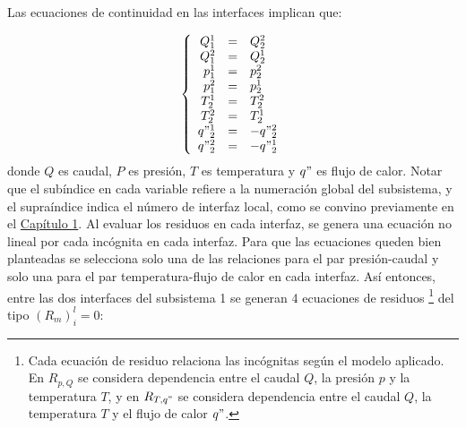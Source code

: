 Las ecuaciones de continuidad en las interfaces implican que:

\begin{equation}
\left\{ \begin{array}{rcl}
Q_1^1&=& Q_2^2 \\
Q_1^2&=& Q_2^1 \\
p_1^1&=& p_2^2 \\
p_1^2&=& p_2^1 \\
T_2^1&=& T_2^2 \\
T_2^2&=& T_2^1 \\
q"_2^1&=& - q"_2^2 \\
q"_2^2&=& - q"_2^1
\end{array}
\right.
\end{equation}
donde $Q$ es caudal, $P$ es presión, $T$ es temperatura y $q"$ es flujo de calor. 
Notar que el subíndice en cada variable refiere a la numeración global del subsistema, y el supraíndice indica el número de interfaz local,
como se convino previamente en el \hyperlink{chapter.1}{Capítulo 1}.
Al evaluar los residuos en cada interfaz, se genera una ecuación no lineal por cada incógnita en cada interfaz.
Para que las ecuaciones queden bien planteadas se selecciona solo una de las relaciones para el par presión-caudal
y solo una para el par temperatura-flujo de calor en cada interfaz.
Así entonces, entre las dos interfaces del subsistema 1 se generan 4 ecuaciones de residuos
\footnote{
Cada ecuación de residuo relaciona las incógnitas según el modelo aplicado.
En $R_{p,Q}$ se considera dependencia entre el caudal $Q$, la presión $p$ y la temperatura $T$, y en 
$R_{T,q"}$ se considera dependencia entre el caudal $Q$, la temperatura $T$ y el flujo de calor $q"$.
} del tipo $(R_m)_{i}^{l}=0$:


